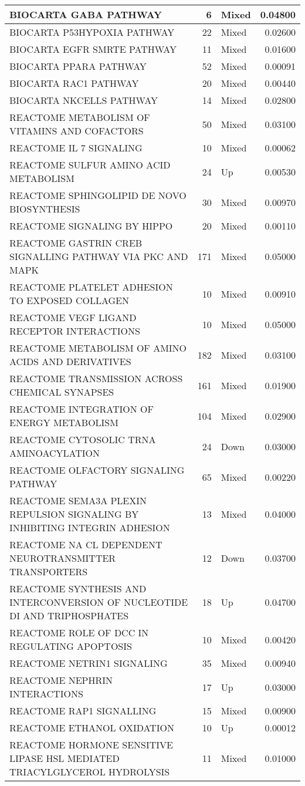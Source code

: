 \documentclass[9pt,a4paper,]{extarticle}
\theoremstyle{definition}
\theoremstyle{definition}
\theoremstyle{definition}
\theoremstyle{remark}
\begin{document}
\begin{table}
{\begin{tabular}[t]{l|r|l|r}
\hline
BIOCARTA GABA PATHWAY & 6 & Mixed & 0.04800\\
\hline
BIOCARTA P53HYPOXIA PATHWAY & 22 & Mixed & 0.02600\\
\hline
BIOCARTA EGFR SMRTE PATHWAY & 11 & Mixed & 0.01600\\
\hline
BIOCARTA PPARA PATHWAY & 52 & Mixed & 0.00091\\
\hline
BIOCARTA RAC1 PATHWAY & 20 & Mixed & 0.00440\\
\hline
BIOCARTA NKCELLS PATHWAY & 14 & Mixed & 0.02800\\
\hline
REACTOME METABOLISM OF VITAMINS AND COFACTORS & 50 & Mixed & 0.03100\\
\hline
REACTOME IL 7 SIGNALING & 10 & Mixed & 0.00062\\
\hline
REACTOME SULFUR AMINO ACID METABOLISM & 24 & Up & 0.00530\\
\hline
REACTOME SPHINGOLIPID DE NOVO BIOSYNTHESIS & 30 & Mixed & 0.00970\\
\hline
REACTOME SIGNALING BY HIPPO & 20 & Mixed & 0.00110\\
\hline
REACTOME GASTRIN CREB SIGNALLING PATHWAY VIA PKC AND MAPK & 171 & Mixed & 0.05000\\
\hline
REACTOME PLATELET ADHESION TO EXPOSED COLLAGEN & 10 & Mixed & 0.00910\\
\hline
REACTOME VEGF LIGAND RECEPTOR INTERACTIONS & 10 & Mixed & 0.05000\\
\hline
REACTOME METABOLISM OF AMINO ACIDS AND DERIVATIVES & 182 & Mixed & 0.03100\\
\hline
REACTOME TRANSMISSION ACROSS CHEMICAL SYNAPSES & 161 & Mixed & 0.01900\\
\hline
REACTOME INTEGRATION OF ENERGY METABOLISM & 104 & Mixed & 0.02900\\
\hline
REACTOME CYTOSOLIC TRNA AMINOACYLATION & 24 & Down & 0.03000\\
\hline
REACTOME OLFACTORY SIGNALING PATHWAY & 65 & Mixed & 0.00220\\
\hline
REACTOME SEMA3A PLEXIN REPULSION SIGNALING BY INHIBITING INTEGRIN ADHESION & 13 & Mixed & 0.04000\\
\hline
REACTOME NA CL DEPENDENT NEUROTRANSMITTER TRANSPORTERS & 12 & Down & 0.03700\\
\hline
REACTOME SYNTHESIS AND INTERCONVERSION OF NUCLEOTIDE DI AND TRIPHOSPHATES & 18 & Up & 0.04700\\
\hline
REACTOME ROLE OF DCC IN REGULATING APOPTOSIS & 10 & Mixed & 0.00420\\
\hline
REACTOME NETRIN1 SIGNALING & 35 & Mixed & 0.00940\\
\hline
REACTOME NEPHRIN INTERACTIONS & 17 & Up & 0.03000\\
\hline
REACTOME RAP1 SIGNALLING & 15 & Mixed & 0.00900\\
\hline
REACTOME ETHANOL OXIDATION & 10 & Up & 0.00012\\
\hline
REACTOME HORMONE SENSITIVE LIPASE HSL MEDIATED TRIACYLGLYCEROL HYDROLYSIS & 11 & Mixed & 0.01000\\
\hline
\end{tabular}}
\end{table}
\end{document}

